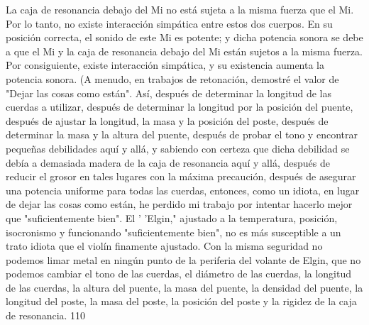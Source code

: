 La caja de resonancia debajo del Mi no está sujeta a la misma fuerza que el Mi. Por lo tanto, no existe interacción simpática entre estos dos cuerpos. En su posición correcta, el sonido de este Mi es potente; y dicha potencia sonora se debe a que el Mi y la caja de resonancia debajo del Mi están sujetos a la misma fuerza. Por consiguiente, existe interacción simpática, y su existencia aumenta la potencia sonora.
(A menudo, en trabajos de retonación, demostré el valor de "Dejar las cosas como están". Así, después de determinar la longitud de las cuerdas a utilizar, después de determinar la longitud por la posición del puente, después de ajustar la longitud, la masa y la posición del poste, después de determinar la masa y la altura del puente, después de probar el tono y encontrar pequeñas debilidades aquí y allá, y sabiendo con certeza que dicha debilidad se debía a demasiada madera de la caja de resonancia aquí y allá, después de reducir el grosor en tales lugares con la máxima precaución, después de asegurar una potencia uniforme para todas las cuerdas, entonces, como un idiota, en lugar de dejar las cosas como están, he perdido mi trabajo por intentar
hacerlo mejor que "suficientemente bien". El ' 'Elgin,"
ajustado a la temperatura, posición, isocronismo y funcionando "suficientemente bien", no es más susceptible a un trato idiota que el violín finamente ajustado. Con la misma seguridad no podemos limar metal en ningún punto de la periferia del volante de Elgin, que no podemos cambiar el tono de las cuerdas, el diámetro de las cuerdas, la longitud de las cuerdas, la altura del puente, la masa del puente, la densidad del puente, la longitud del poste, la masa del poste, la posición del poste y la rigidez de la caja de resonancia.
110

